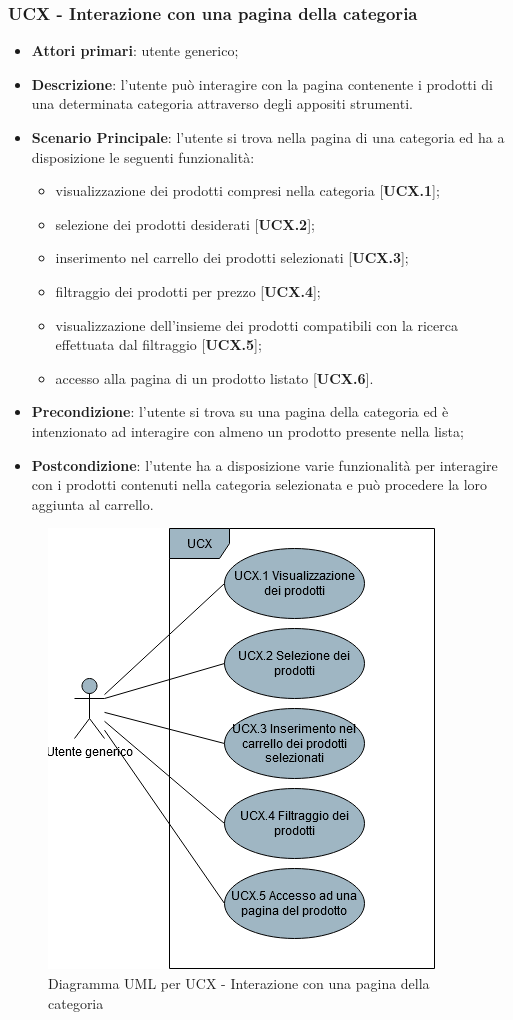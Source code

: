 \subsubsection{UCX - Interazione con una pagina della categoria}
\begin{itemize}
\item \textbf{Attori primari}: utente generico;
\item \textbf{Descrizione}: l'utente può interagire con la pagina contenente i prodotti di una determinata categoria attraverso degli appositi strumenti.
\item \textbf{Scenario Principale}: l'utente si trova nella pagina di una categoria ed ha a disposizione le seguenti funzionalità:
\begin{itemize}
\item visualizzazione dei prodotti compresi nella categoria [\textbf{UCX.1}];
\item selezione dei prodotti desiderati [\textbf{UCX.2}];
\item inserimento nel carrello dei prodotti selezionati [\textbf{UCX.3}];
\item filtraggio dei prodotti per prezzo [\textbf{UCX.4}];
\item visualizzazione dell'insieme dei prodotti compatibili con la ricerca effettuata dal filtraggio [\textbf{UCX.5}];
\item accesso alla pagina di un prodotto listato [\textbf{UCX.6}].
\end{itemize}
\item \textbf{Precondizione}: l'utente si trova su una pagina della categoria ed è intenzionato ad interagire con almeno un prodotto presente nella lista;
\item \textbf{Postcondizione}: l'utente ha a disposizione varie funzionalità per interagire con i prodotti contenuti nella categoria selezionata e può procedere la loro aggiunta al carrello.
\end{itemize}
\begin{figure}[H]
\centering
\includegraphics[scale=0.6]{res/UseCase/Immagini/InterazionePaginaCategoria}
\caption{Diagramma UML per UCX - Interazione con una pagina della categoria}
\end{figure}
